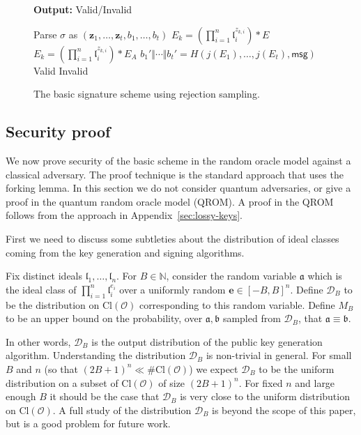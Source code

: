 \documentclass{llncs}
\newcommand{\D}{\mathcal{D}}
\newcommand{\N}{\mathbb{N}}
\newcommand{\OO}{\mathcal{O}}
\newcommand{\Cl}{\text{Cl}}
\newcommand{\msg}{\textsf{msg}}
\renewcommand{\a}{\mathfrak{a}}
\renewcommand{\b}{\mathfrak{b}}
\renewcommand{\l}{\mathfrak{l}}
\newcommand{\e}{\textbf{e}}
\newcommand{\z}{\textbf{z}}
\begin{document}
\begin{figure}
\begin{minipage}{0.45\textwidth}
\begin{algorithm}[H]
	\textbf{Output:} Valid/Invalid

	\begin{algorithmic}[1]
		\State Parse $\sigma$ as $(\z_1, \dots, \z_t, b_1 , \dots, b_t)$
		\State $E_k = ( \prod_{i=1}^n \l_i^{z_{k,i}} ) * E$
		\Else
		\State $E_k = ( \prod_{i=1}^n \l_i^{z_{k,i}} ) * E_A$
		\EndIf
		\EndFor
		\State $b_1' \Vert \cdots \Vert b_t' = H( j(E_1) , \dots, j(E_t), \msg )$
		 \State \Return Valid
		\Else \State \Return Invalid \EndIf
	\end{algorithmic}
\end{algorithm}
\end{minipage}
\caption{The basic signature scheme using rejection sampling.\label{fig:sig-scheme}}
\end{figure}




\subsection{Security proof}
\label{sec:security-proof}

We now prove security of the basic scheme in the random oracle model against a classical adversary. 
The proof technique is the standard approach that uses the forking lemma.
In this section we do not consider quantum adversaries, or give a proof in the quantum random oracle model (QROM).
A proof in the QROM follows from the approach in Appendix~\ref{sec:lossy-keys}.

First we need to discuss some subtleties about the distribution of ideal classes coming from the key generation and signing algorithms.

\begin{definition} \label{defn:sampling-distributions}
Fix distinct ideals $\l_1, \dots, \l_n$.
For $B \in \N$, consider the random variable $\a$ which is the ideal class of $\prod_{i=1}^n \l_i^{e_i}$ over a uniformly random $\e \in [-B,B]^n$.
Define $\D_B$ to be the distribution on $\Cl( \OO )$ corresponding to this random variable.
%
Define $M_B$ to be an upper bound on the probability, over $\a, \b$ sampled from $\D_B$, that $\a \equiv \b$.
\end{definition}

In other words, $\D_B$ is the output distribution of the public key generation algorithm.
Understanding the distribution $\D_B$ is non-trivial in general.
For small $B$ and $n$ (so that $(2B+1)^n \ll \#\Cl(\OO)$) we expect $\D_B$ to be the uniform distribution on a subset of $\Cl(\OO)$ of size $(2B+1)^n$. For fixed $n$ and large enough $B$ it should be the case that $\D_B$ is very close to the uniform distribution on $\Cl(\OO)$.
A full study of the distribution $\D_B$ is beyond the scope of this paper, but is a good problem for future work.
\end{document}
